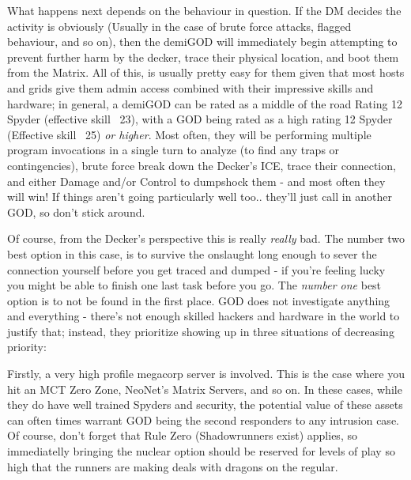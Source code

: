 \begin{multicols}{3}
	What happens next depends on the behaviour in question. If the DM decides the activity is obviously (Usually in the case of brute force attacks, flagged behaviour, and so on), then the demiGOD will immediately begin attempting to prevent further harm by the decker, trace their physical location, and boot them from the Matrix. All of this, is usually pretty easy for them given that most hosts and grids give them admin access combined with their impressive skills and hardware; in general, a demiGOD can be rated as a middle of the road Rating 12 Spyder (effective skill ~23), with a GOD being rated as a high rating 12 Spyder (Effective skill ~25) \textit{or higher}. Most often, they will be performing multiple program invocations in a single turn to analyze (to find any traps or contingencies), brute force break down the Decker's ICE, trace their connection, and either Damage and/or Control to dumpshock them - and most often they will win! If things aren't going particularly well too.. they'll just call in another GOD, so don't stick around.
	
	Of course, from the Decker's perspective this is really \textit{really} bad. The number two best option in this case, is to survive the onslaught long enough to sever the connection yourself before you get traced and dumped - if you're feeling lucky you might be able to finish one last task before you go. The \textit{number one} best option is to not be found in the first place. GOD does not investigate anything and everything - there's not enough skilled hackers and hardware in the world to justify that; instead, they prioritize showing up in three situations of decreasing priority: 
	
	Firstly, a very high profile megacorp server is involved. This is the case where you hit an MCT Zero Zone, NeoNet's Matrix Servers, and so on. In these cases, while they do have well trained Spyders and security, the potential value of these assets can often times warrant GOD being the second responders to any intrusion case. Of course, don't forget that Rule Zero (Shadowrunners exist) applies, so immediatelly bringing the nuclear option should be reserved for levels of play so high that the runners are making deals with dragons on the regular.
	

\end{multicols}
